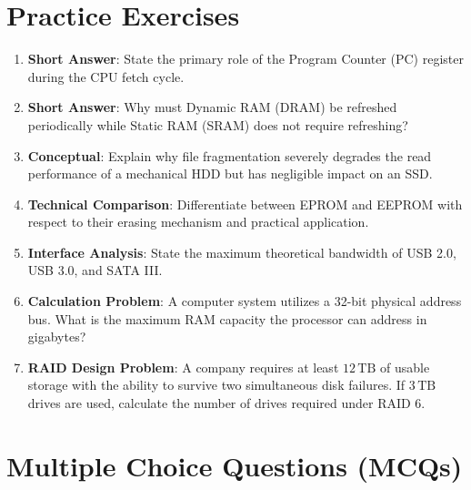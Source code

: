 \section{Practice Exercises}

\begin{practiceset}
\begin{enumerate}[leftmargin=1.5em]
    \item \textbf{Short Answer}: State the primary role of the Program Counter (PC) register during the CPU fetch cycle.
    \item \textbf{Short Answer}: Why must Dynamic RAM (DRAM) be refreshed periodically while Static RAM (SRAM) does not require refreshing?
    \item \textbf{Conceptual}: Explain why file fragmentation severely degrades the read performance of a mechanical HDD but has negligible impact on an SSD.
    \item \textbf{Technical Comparison}: Differentiate between EPROM and EEPROM with respect to their erasing mechanism and practical application.
    \item \textbf{Interface Analysis}: State the maximum theoretical bandwidth of USB 2.0, USB 3.0, and SATA III.
    \item \textbf{Calculation Problem}: A computer system utilizes a 32-bit physical address bus. What is the maximum RAM capacity the processor can address in gigabytes?
    \item \textbf{RAID Design Problem}: A company requires at least $12\,\text{TB}$ of usable storage with the ability to survive two simultaneous disk failures. If $3\,\text{TB}$ drives are used, calculate the number of drives required under RAID 6.
\end{enumerate}
\end{practiceset}

\section{Multiple Choice Questions (MCQs)}

